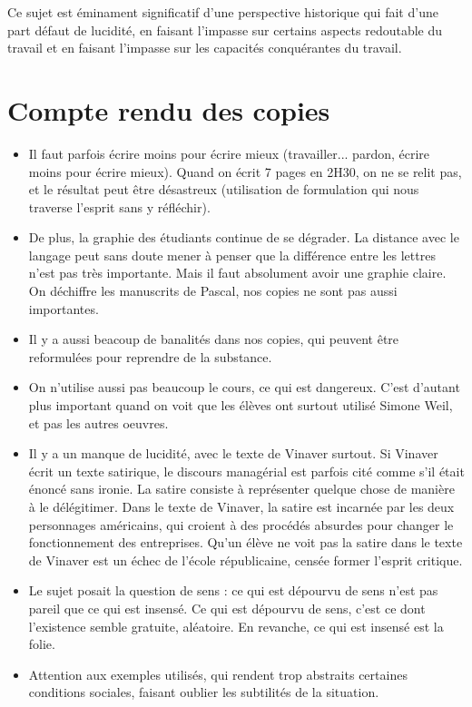 \documentclass[a4paper,12pt]{book}
\begin{document}
Ce sujet est éminament significatif d'une perspective historique qui fait d'une part défaut de lucidité, en faisant l'impasse sur certains aspects redoutable du travail et en faisant l'impasse sur les capacités conquérantes du travail.


\section{Compte rendu des copies}\begin{itemize}
\item Il faut parfois écrire moins pour écrire mieux (travailler... pardon, écrire moins pour écrire mieux). Quand on écrit 7 pages en 2H30, on ne se relit pas, et le résultat peut être désastreux (utilisation de formulation qui nous traverse l'esprit sans y réfléchir).
\item De plus, la graphie des étudiants continue de se dégrader. La distance avec le langage peut sans doute mener à penser que la différence entre les lettres n'est pas très importante. Mais il faut absolument avoir une graphie claire. On déchiffre les manuscrits de Pascal, nos copies ne sont pas aussi importantes.
\item Il y a aussi beacoup de banalités dans nos copies, qui peuvent être reformulées pour reprendre de la substance. 
\item On n'utilise aussi pas beaucoup le cours, ce qui est dangereux. C'est d'autant plus important quand on voit que les élèves ont surtout utilisé Simone Weil, et pas les autres oeuvres.
\item Il y a un manque de lucidité, avec le texte de Vinaver surtout. Si Vinaver écrit un texte satirique, le discours managérial est parfois cité comme s'il était énoncé sans ironie. La satire consiste à représenter quelque chose de manière à le délégitimer. Dans le texte de Vinaver, la satire est incarnée par les deux personnages américains, qui croient à des procédés absurdes pour changer le fonctionnement des entreprises. Qu'un élève ne voit pas la satire dans le texte de Vinaver est un échec de l'école républicaine, censée former l'esprit critique.
\item Le sujet posait la question de sens : ce qui est dépourvu de sens n'est pas pareil que ce qui est insensé. Ce qui est dépourvu de sens, c'est ce dont l'existence semble gratuite, aléatoire. En revanche, ce qui est insensé est la folie.
\item Attention aux exemples utilisés, qui rendent trop abstraits certaines conditions sociales, faisant oublier les subtilités de la situation.

\end{itemize}
\end{document}

